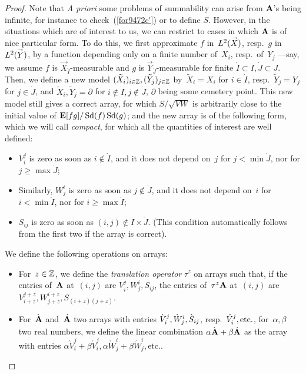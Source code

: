\begin{proof}
Note that \emph{A priori} some problems of summability can arise from $\mathbf{A}$'s being infinite,
for instance to check~(\ref{for9472c'}) or to define $S$.
However, in the situations which are of interest to us,
we can restrict to cases in which $\mathbf{A}$ is of nice particular form.
To do this, we first approximate $f$ in~$\ldb(\vec{X})$, resp.~$g$ in~$\ldb(\vec{Y})$,
by a function depending only on a finite number of~$X_i$, resp.\ of~$Y_j$
—say, we assume $f$ is $\vec{X}_{\dot{I}}$-measurable
and $g$ is $\vec{Y}_{\dot{J}}$-measurable for finite $\dot{I} \subset I, \dot{J} \subset J$.
%
Then, we define a new model $(\tilde{X}_i)_{i\in\ZZ}, (\tilde{Y}_j)_{j\in\ZZ}$
by~$\tilde{X}_i = X_i$ for $i\in\dot{I}$, resp.\ $\tilde{Y}_j = Y_j$ for $j\in\dot{J}$,
and $\tilde{X}_i, \tilde{Y}_j = \partial$ for $i\notin\dot{I}, j\notin\dot{J}$,
$\partial$ being some cemetery point.
This new model still gives a correct array,
for which $S/\sqrt{VW}$ is arbitrarily close to the initial value of
$\mathop{\smash{\mathbf{E}}}\nolimits[fg]/\operatorname{Sd}(f)\operatorname{Sd}(g)$;
and the new array is of the following form, which we will call \emph{compact},
for which all the quantities of interest are well defined:
\begin{itemize}
\item $V^j_i$ is zero as soon as $i\notin\dot{I}$, and it does not depend on~$j$
for $j < \min\dot{J}$, nor for $j \geq \max\dot{J}$;
\item Similarly, $W^i_j$ is zero as soon as $j\notin\dot{J}$, and it does not depend on~$i$
for $i < \min\dot{I}$, nor for $i \geq \max\dot{I}$;
\item $S_{ij}$ is zero as soon as $(i,j)\notin\dot{I}\times\dot{J}$.
(This condition automatically follows from the first two if the array is correct).
\end{itemize}

We define the following operations on arrays:
\begin{Def}\strut\begin{itemize}
\item For~$z\in\mathbb{Z}$, we define the \emph{translation operator} $\tau^z$ on arrays
such that, if the entries of~$\mathbf{A}$ at~$(i,j)$ are $V_i^j,W_j^i,S_{ij}$,
the entries of~$\tau^z\mathbf{A}$ at~$(i,j)$ are $V_{i+z}^{j+z},W_{j+z}^{i+z},S_{(i+z)(j+z)}$.
\item For~$\grave{\mbf{A}}$ and~$\acute{\mbf{A}}$ two arrays
with entries $\grave{V}_i^j, \ab \grave{W}_j^i, \ab \grave{S}_{ij}$,
resp.~$\acute{V}_i^j, \ab \text{etc.}$,
for~$\alpha, \beta$ two real numbers,
we define the linear combination $\alpha\grave{\mbf{A}} + \beta\acute{\mbf{A}}$
as the array with entries $\alpha\grave{V}_i^j+\beta\acute{V}_i^j,
\alpha\grave{W}_j^i+\beta\acute{W}_j^i,\text{etc.}$.
\end{itemize}\end{Def}


\end{proof}
